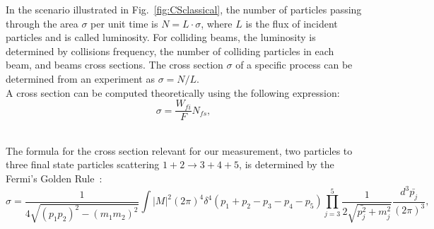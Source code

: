 In the scenario illustrated in Fig.~\ref{fig:CSclassical}, the number of particles passing through the area $\sigma$ per unit time is $N=L \cdot \sigma$, where $L$ is the flux of incident particles and is called luminosity. For colliding beams, the luminosity is determined by collisions frequency, the number of colliding particles in each beam, and beams cross sections. The cross section $\sigma$ of a specific process can be determined from an experiment as $\sigma=N/L$. \\

A cross section can be computed theoretically using the following expression:\\

\begin{equation}
  \sigma = \frac{W_{fi}}{F} N_{fs},
\end{equation}

\\ 

The formula for the cross section relevant for our measurement, two particles to three final state particles scattering $1+2\rightarrow 3+4+5$, is determined by the Fermi's Golden Rule~\cite{ref_Griffiths}: \\

\begin{equation}\label{eq:FermiGoldenRule}
  \sigma = \frac{ 1 }{4\sqrt{(p_1p_2)^2-(m_1m_2)^2}} \int |M|^2 (2\pi)^4 \delta^4(p_1+p_2-p_3-p_4-p_5) \prod_{j=3}^{5} \frac{1}{2 \sqrt{\bar{p_j^2}+m_j^2 }}\frac{d^3\bar{p_j}}{(2\pi)^3},  
\end{equation}

\\ 

